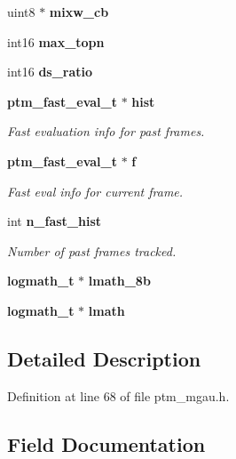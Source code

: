 \begin{DoxyCompactItemize}
\item 
uint8 $\ast$ {\bfseries mixw\-\_\-cb}\label{structptm__mgau__s_a5a3c76d47b94978f717a65fa0dfb54e8}

\item 
int16 {\bfseries max\-\_\-topn}\label{structptm__mgau__s_ab397cfdf51d309de4521edc09e80541d}

\item 
int16 {\bfseries ds\-\_\-ratio}\label{structptm__mgau__s_a2254b6ec79c97516b326ad33d22d0050}

\item 
{\bf ptm\-\_\-fast\-\_\-eval\-\_\-t} $\ast$ {\bf hist}
\begin{DoxyCompactList}\small\item\em Fast evaluation info for past frames. \end{DoxyCompactList}\item 
{\bf ptm\-\_\-fast\-\_\-eval\-\_\-t} $\ast$ {\bf f}
\begin{DoxyCompactList}\small\item\em Fast eval info for current frame. \end{DoxyCompactList}\item 
int {\bf n\-\_\-fast\-\_\-hist}
\begin{DoxyCompactList}\small\item\em Number of past frames tracked. \end{DoxyCompactList}\item 
{\bf logmath\-\_\-t} $\ast$ {\bfseries lmath\-\_\-8b}\label{structptm__mgau__s_ad577181af2afca66f33f1f1e4c576ae8}

\item 
{\bf logmath\-\_\-t} $\ast$ {\bfseries lmath}\label{structptm__mgau__s_abbaabfb8678356673a2c0a515e33a378}

\end{DoxyCompactItemize}


\subsection{Detailed Description}


Definition at line 68 of file ptm\-\_\-mgau.\-h.



\subsection{Field Documentation}
